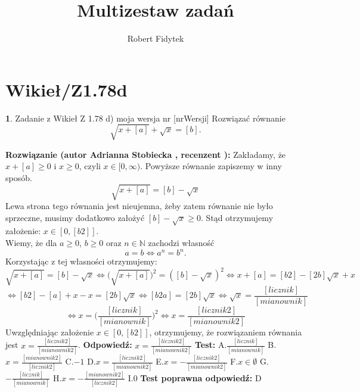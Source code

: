 \documentclass[12pt, a4paper]{article}
\title{Multizestaw zadań}
\author{Robert Fidytek}
\date{}
\theoremstyle{definition} %
\newtheorem{zad}{}
\newcommand{\kategoria}[1]{\section{#1}} %
\newcommand{\zadStart}[1]{\begin{zad}#1\newline} %
\newcommand{\zadStop}{\end{zad}}   %
\newcommand{\rozwStart}[2]{\noindent \textbf{Rozwiązanie (autor #1 , recenzent #2): }\newline} %
\newcommand{\rozwStop}{\newline}                                            %
\newcommand{\odpStart}{\noindent \textbf{Odpowiedź:}\newline}    %
\newcommand{\odpStop}{\newline}                                             %
\newcommand{\testStart}{\noindent \textbf{Test:}\newline} %
\newcommand{\testStop}{\newline} %
\newcommand{\kluczStart}{\noindent \textbf{Test poprawna odpowiedź:}\newline} %
\newcommand{\kluczStop}{\newline} %
\begin{document}
\maketitle


\kategoria{Wikieł/Z1.78d}
\zadStart{Zadanie z Wikieł Z 1.78 d) moja wersja nr [nrWersji]}
Rozwiązać równanie
$$\sqrt{x+[a]}+\sqrt{x}=[b].$$
\zadStop
\rozwStart{Adrianna Stobiecka}{}
Zakładamy, że $x+[a]\geq0$ i $x\geq0$, czyli $x\in[0,\infty)$. Powyższe równanie zapiszemy w inny sposób.
$$\sqrt{x+[a]}=[b]-\sqrt{x}$$
Lewa strona tego równania jest nieujemna, żeby zatem równanie nie było sprzeczne, musimy dodatkowo założyć $[b]-\sqrt{x}\geq0$. Stąd otrzymujemy założenie: $x\in[0,[b2]]$.
\\Wiemy, że dla $a\geq0$, $b\geq0$ oraz $n\in\mathbb{N}$ zachodzi własność
$$a=b\Leftrightarrow a^n=b^n.$$ 
Korzystając z tej własności otrzymujemy:
$$\sqrt{x+[a]}=[b]-\sqrt{x}\Leftrightarrow\big(\sqrt{x+[a]}\big)^2=([b]-\sqrt{x})^2\Leftrightarrow x+[a]=[b2]-[2b]\sqrt{x}+x$$
$$\Leftrightarrow[b2]-[a]+x-x=[2b]\sqrt{x}\Leftrightarrow[b2a]=[2b]\sqrt{x}\Leftrightarrow\sqrt{x}=\frac{[licznik]}{[mianownik]}$$
$$\Leftrightarrow x=\bigg(\frac{[licznik]}{[mianownik]}\bigg)^2\Leftrightarrow x=\frac{[licznik2]}{[mianownik2]}$$
Uwzględniając założenie $x\in[0,[b2]]$, otrzymujemy, że rozwiązaniem równania jest $x=\frac{[licznik2]}{[mianownik2]}$.
\rozwStop
\odpStart
$x=\frac{[licznik2]}{[mianownik2]}$
\odpStop
\testStart
A.$\frac{[licznik]}{[mianownik]}$
B.$x=\frac{[mianownik2]}{[licznik2]}$
C.$-1$
D.$x=\frac{[licznik2]}{[mianownik2]}$
E.$x=-\frac{[licznik2]}{[mianownik2]}$
F.$x\in\emptyset$
G.$-\frac{[licznik]}{[mianownik]}$
H.$x=-\frac{[mianownik2]}{[licznik2]}$
I.$0$
\testStop
\kluczStart
D
\kluczStop
\end{document}
